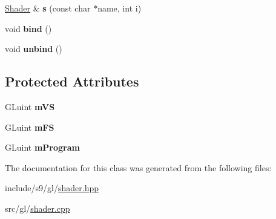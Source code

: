 \begin{DoxyCompactItemize}
\item 
\hypertarget{classs9_1_1gl_1_1Shader_a997847a1445032738c7ec6f3c4e6b78b}{\hyperlink{classs9_1_1gl_1_1Shader}{\-Shader} \& {\bfseries s} (const char $\ast$name, int i)}\label{classs9_1_1gl_1_1Shader_a997847a1445032738c7ec6f3c4e6b78b}

\item 
\hypertarget{classs9_1_1gl_1_1Shader_aa093f3ad27b49cc62950faa98343b974}{void {\bfseries bind} ()}\label{classs9_1_1gl_1_1Shader_aa093f3ad27b49cc62950faa98343b974}

\item 
\hypertarget{classs9_1_1gl_1_1Shader_a10c6c9ee752aab4e531536917cc558fe}{void {\bfseries unbind} ()}\label{classs9_1_1gl_1_1Shader_a10c6c9ee752aab4e531536917cc558fe}

\end{DoxyCompactItemize}
\subsection*{\-Protected \-Attributes}
\begin{DoxyCompactItemize}
\item 
\hypertarget{classs9_1_1gl_1_1Shader_a0ddf36b750d8acd0599929cf98803f47}{\-G\-Luint {\bfseries m\-V\-S}}\label{classs9_1_1gl_1_1Shader_a0ddf36b750d8acd0599929cf98803f47}

\item 
\hypertarget{classs9_1_1gl_1_1Shader_a0427f9b1b88eea010493470529d8ece9}{\-G\-Luint {\bfseries m\-F\-S}}\label{classs9_1_1gl_1_1Shader_a0427f9b1b88eea010493470529d8ece9}

\item 
\hypertarget{classs9_1_1gl_1_1Shader_a4a648a529a4edb3df43f3e8fcbfc19b5}{\-G\-Luint {\bfseries m\-Program}}\label{classs9_1_1gl_1_1Shader_a4a648a529a4edb3df43f3e8fcbfc19b5}

\end{DoxyCompactItemize}


\-The documentation for this class was generated from the following files\-:\begin{DoxyCompactItemize}
\item 
include/s9/gl/\hyperlink{shader_8hpp}{shader.\-hpp}\item 
src/gl/\hyperlink{shader_8cpp}{shader.\-cpp}\end{DoxyCompactItemize}
